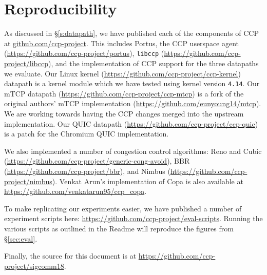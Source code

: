 \section{Reproducibility}
\label{sec:repro}

As discussed in \S\ref{s:datapath}, we have published each of the components of CCP at \url{github.com/ccp-project}. 
This includes Portus, the CCP userspace agent (\url{https://github.com/ccp-project/portus}), \texttt{libccp} (\url{https://github.com/ccp-project/libccp}), and the implementation of CCP support for the three datapaths we evaluate. 
Our Linux kernel (\url{https://github.com/ccp-project/ccp-kernel}) datapath is a kernel module which we have tested using kernel version \texttt{4.14}. 
Our mTCP datapath (\url{https://github.com/ccp-project/ccp-mtcp}) is a fork of the original authors' mTCP implementation (\url{https://github.com/eunyoung14/mtcp}). We are working towards having the CCP changes merged into the upstream implementation.
Our QUIC datapath (\url{https://github.com/ccp-project/ccp-quic}) is a patch for the Chromium QUIC implementation. 

We also implemented a number of congestion control algorithms: Reno and Cubic (\url{https://github.com/ccp-project/generic-cong-avoid}), BBR (\url{https://github.com/ccp-project/bbr}), and Nimbus (\url{https://github.com/ccp-project/nimbus}). Venkat Arun's implementation of Copa is also available at \url{https://github.com/venkatarun95/ccp_copa}.

To make replicating our experiments easier, we have published a number of experiment scripts here: \url{https://github.com/ccp-project/eval-scripts}. Running the various scripts as outlined in the Readme will reproduce the figures from \S\ref{sec:eval}.

Finally, the source for this document is at \url{https://github.com/ccp-project/sigcomm18}.
